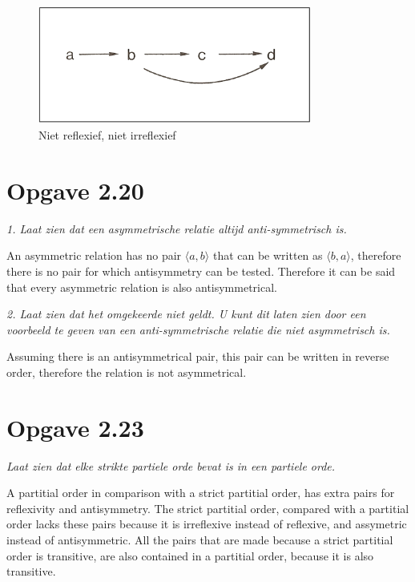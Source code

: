 \documentclass[11pt]{article}
\begin{document}
\begin{figure}[ht!]
\centering
\includegraphics[width=90mm]{image1.png}
\caption{Niet reflexief, niet irreﬂexief \label{overflow}}
\end{figure}

\section*{Opgave 2.20}
\textit{1. Laat zien dat een asymmetrische relatie altijd anti-symmetrisch is.}
\newline

An asymmetric relation has no pair $ \langle a, b \rangle $ that can be written as $ \langle b, a \rangle $, therefore there is no pair for which antisymmetry can be tested. Therefore it can be said that every asymmetric relation is also antisymmetrical.
\newline

\textit{2. Laat zien dat het omgekeerde niet geldt. U kunt dit laten zien door een voorbeeld te geven van een anti-symmetrische relatie die niet asymmetrisch is.}
\newline

Assuming there is an antisymmetrical pair, this pair can be written in reverse order, therefore the relation is not asymmetrical.


\section*{Opgave 2.23}
\textit{Laat zien dat elke strikte partiele orde bevat is in een partiele orde.}
\newline

A partitial order in comparison with a strict partitial order, has extra pairs for reflexivity and antisymmetry. The strict partitial order, compared with a partitial order lacks these pairs because it is irreflexive instead of reflexive, and assymetric instead of antisymmetric. All the pairs that are made because a strict partitial order is transitive, are also contained in a partitial order, because it is also transitive.
\end{document}
